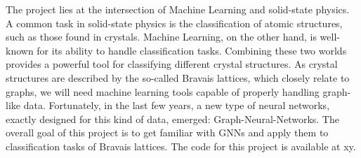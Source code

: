 The project lies at the intersection of Machine Learning and solid-state physics. 
A common task in solid-state physics is the classification of atomic structures, such as those found in crystals.
Machine Learning, on the other hand, is well-known for its ability to handle classification tasks. Combining these two worlds provides a powerful tool for 
classifying different crystal structures. 
As crystal structures are described by the so-called Bravais lattices, which closely relate to graphs, we will need machine learning tools capable of properly handling graph-like data.
Fortunately, in the last few years, a new type of neural networks, exactly designed for this kind of data, emerged: Graph-Neural-Networks.
The overall goal of this project is to get familiar with GNNs and apply them to classification tasks of Bravais lattices.
The code for this project is available at xy.